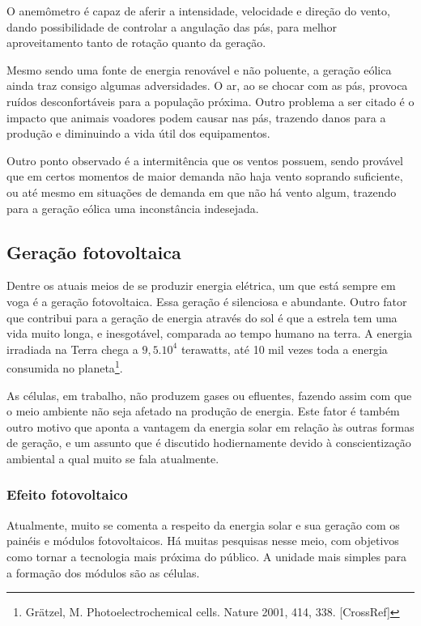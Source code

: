\documentclass[
]{article}
\begin{document}
O anemômetro é capaz de aferir a intensidade, velocidade e direção do
vento, dando possibilidade de controlar a angulação das pás, para melhor
aproveitamento tanto de rotação quanto da geração.

Mesmo sendo uma fonte de energia renovável e não poluente, a geração
eólica ainda traz consigo algumas adversidades. O ar, ao se chocar com
as pás, provoca ruídos desconfortáveis para a população próxima. Outro
problema a ser citado é o impacto que animais voadores podem causar nas
pás, trazendo danos para a produção e diminuindo a vida útil dos
equipamentos.

Outro ponto observado é a intermitência que os ventos possuem, sendo
provável que em certos momentos de maior demanda não haja vento soprando
suficiente, ou até mesmo em situações de demanda em que não há vento
algum, trazendo para a geração eólica uma inconstância indesejada.

\hypertarget{gerauxe7uxe3o-fotovoltaica}{%
\subsection{Geração fotovoltaica}\label{gerauxe7uxe3o-fotovoltaica}}

Dentre os atuais meios de se produzir energia elétrica, um que está
sempre em voga é a geração fotovoltaica. Essa geração é silenciosa e
abundante. Outro fator que contribui para a geração de energia através
do sol é que a estrela tem uma vida muito longa, e inesgotável,
comparada ao tempo humano na terra. A energia irradiada na Terra chega a
\(9,5.10^4\) terawatts, até 10 mil vezes toda a energia consumida no
planeta\footnote{Grätzel, M. Photoelectrochemical cells. Nature 2001,
  414, 338. {[}CrossRef{]}}.

As células, em trabalho, não produzem gases ou efluentes, fazendo assim
com que o meio ambiente não seja afetado na produção de energia. Este
fator é também outro motivo que aponta a vantagem da energia solar em
relação às outras formas de geração, e um assunto que é discutido
hodiernamente devido à conscientização ambiental a qual muito se fala
atualmente.

\hypertarget{efeito-fotovoltaico}{%
\subsubsection{Efeito fotovoltaico}\label{efeito-fotovoltaico}}

Atualmente, muito se comenta a respeito da energia solar e sua geração
com os painéis e módulos fotovoltaicos. Há muitas pesquisas nesse meio,
com objetivos como tornar a tecnologia mais próxima do público. A
unidade mais simples para a formação dos módulos são as células.
\end{document}
